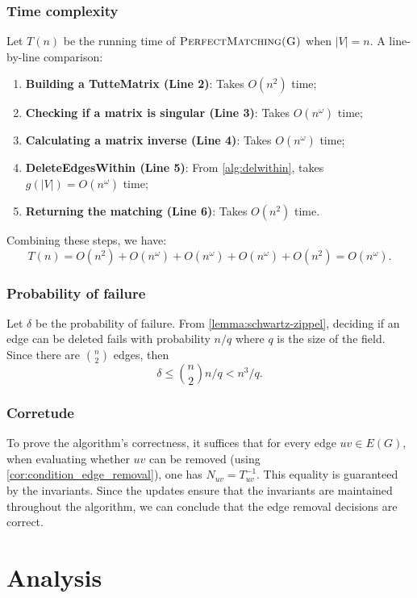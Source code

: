 \subsubsection{Time complexity}
\noindent
Let \(T(n)\) be the running time of \(\textsc{PerfectMatching(G)}\) when \(|V| = n\). 
A line-by-line comparison:
\begin{enumerate}
  \item \textbf{Building a TutteMatrix (Line 2)}: Takes \(O(n^2)\) time;
  \item \textbf{Checking if a matrix is singular (Line 3)}: Takes \(O(n^\omega)\) time;
  \item \textbf{Calculating a matrix inverse (Line 4)}: Takes \(O(n^\omega)\) time;
  \item \textbf{DeleteEdgesWithin (Line 5)}: From \cref{alg:delwithin}, takes \(g(|V|) = O(n^\omega)\) time;
  \item \textbf{Returning the matching (Line 6)}: Takes \(O(n^2)\) time.
\end{enumerate}
Combining these steps, we have:
\begin{equation}
\label{alg:harvey_complexity}
    T(n) = O(n^2) + O(n^\omega) + O(n^\omega) + O(n^\omega) + O(n^2) = O(n^\omega).
\end{equation}

\subsubsection{Probability of failure}
\noindent
Let \(\delta\) be the probability of failure.
From \cref{lemma:schwartz-zippel}, deciding if an edge can be deleted fails with probability \(n / q\) where \(q\) is the size of the field. 
Since there are \(\binom{n}{2}\) edges, then 
\[
  \delta \leq \binom{n}{2} n / q < n^3 / q.
\]

\subsubsection{Corretude}
\noindent
To prove the algorithm's correctness, it suffices that for every edge \(uv \in E(G)\), when evaluating whether \(uv\) can be removed (using \cref{cor:condition_edge_removal}), one has \(N_{uv} = T^{-1}_{uv}\).
This equality is guaranteed by the invariants.
Since the updates ensure that the invariants are maintained throughout the algorithm, we can conclude that the edge removal decisions are correct.

\section{Analysis}

